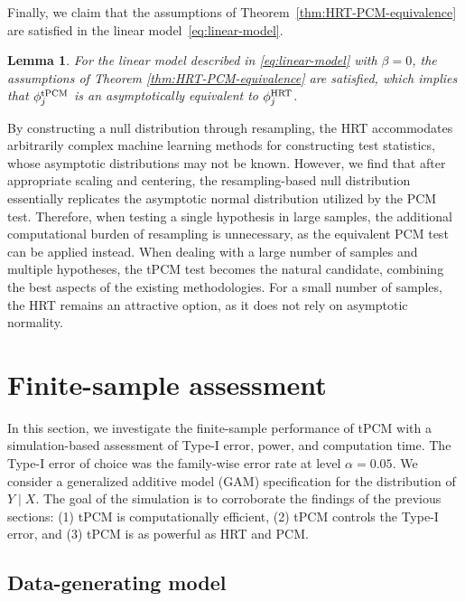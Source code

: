 \documentclass[12pt]{article}
\newtheorem{lemma}{Lemma}
\theoremstyle{definition}
\theoremstyle{remark}
\begin{document}
\noindent Finally, we claim that the assumptions of Theorem~\ref{thm:HRT-PCM-equivalence} are satisfied in the linear model~\eqref{eq:linear-model}.
\begin{lemma}\label{lemma:linear-model-equivalence-to-HRT}
	For the linear model described in \eqref{eq:linear-model} with $\beta = 0$, the assumptions of Theorem \ref{thm:HRT-PCM-equivalence} are satisfied, which implies that $\phi_j^{\textnormal{tPCM}}$ is an asymptotically equivalent to $\phi_j^{\textnormal{HRT}}$.
\end{lemma}

By constructing a null distribution through resampling, the HRT accommodates arbitrarily complex machine learning methods for constructing test statistics, whose asymptotic distributions may not be known. However, we find that after appropriate scaling and centering, the resampling-based null distribution essentially replicates the asymptotic normal distribution utilized by the PCM test. Therefore, when testing a single hypothesis in large samples, the additional computational burden of resampling is unnecessary, as the equivalent PCM test can be applied instead. When dealing with a large number of samples and multiple hypotheses, the tPCM test becomes the natural candidate, combining the best aspects of the existing methodologies. For a small number of samples, the HRT remains an attractive option, as it does not rely on asymptotic normality.

	\section{Finite-sample assessment}\label{sec:sim-study}
	In this section, we investigate the finite-sample performance of tPCM with a simulation-based assessment of Type-I error,
	power, and computation time. The Type-I error of choice was the family-wise error rate at level $\alpha = 0.05$. We consider a generalized additive model (GAM) specification for the distribution of $Y \mid X$. The goal of the simulation is to corroborate the findings of the previous sections: (1) tPCM is computationally efficient, (2) tPCM controls the Type-I error, and (3) tPCM is as powerful as HRT and PCM. 
	\subsection{Data-generating model}
\end{document}
